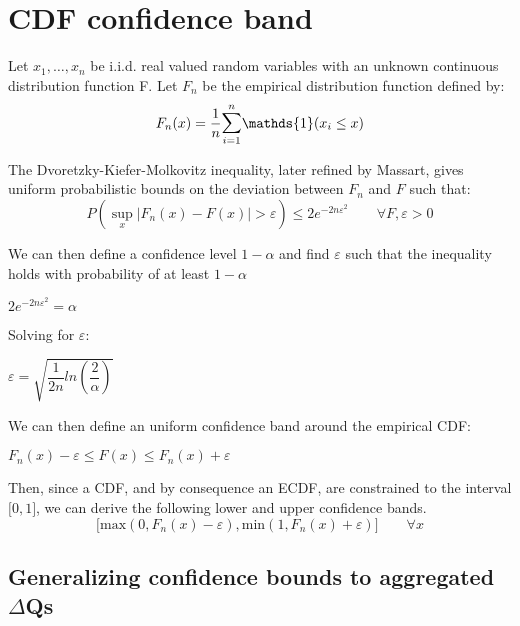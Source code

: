 \section{CDF confidence band}

    Let $x_1, \dots, x_n$ be i.i.d. real valued random variables with an unknown continuous distribution function F.
    Let $F_n$ be the empirical distribution function defined by: 
    \begin{equation}
        F_n(x) = \frac{1}{n}\mathlarger\sum^n_{i = 1}  \mathds{1}(x_i \le x)
            \label{eq:ecdf}
    \end{equation}
    
    The Dvoretzky-Kiefer-Molkovitz inequality, later refined by Massart, gives uniform probabilistic bounds on the deviation between $F_n$ and $F$ such that:
    \begin{equation}
        P(\sup_x | F_n (x) - F(x) | > \varepsilon) \le 2e^{-2n\varepsilon^2} \qquad{\forall F, \varepsilon > 0}
        \label{eq:DKW}
    \end{equation}

    We can then define a confidence level $ 1 - \alpha$ and find $\varepsilon$ such that the inequality holds with probability of at least $ 1 - \alpha $
    \begin{center}
        $2e^{-2n\varepsilon^2} = \alpha$
    \end{center}

    Solving for $\varepsilon$:
    \begin{center}
        $\varepsilon = \sqrt{\dfrac{1}{2n}ln(\dfrac{2}{\alpha})}$
    \end{center}

    We can then define an uniform confidence band around the empirical CDF:
    \begin{center}
        $F_n(x) - \varepsilon \le F(x) \le F_n(x) + \varepsilon$
    \end{center}

    Then, since a CDF, and by consequence an ECDF, are constrained to the interval $\lbrack 0, 1 \rbrack$, we can derive the following lower and upper confidence bands.
    \begin{equation}
        \lbrack\text{max}(0, F_n(x) - \varepsilon), \text{min}(1, F_n(x) + \varepsilon)\rbrack \qquad \forall x
        \label{eq:bounds}
    \end{equation}

    \subsection{Generalizing confidence bounds to aggregated $\Delta$Qs}
    
